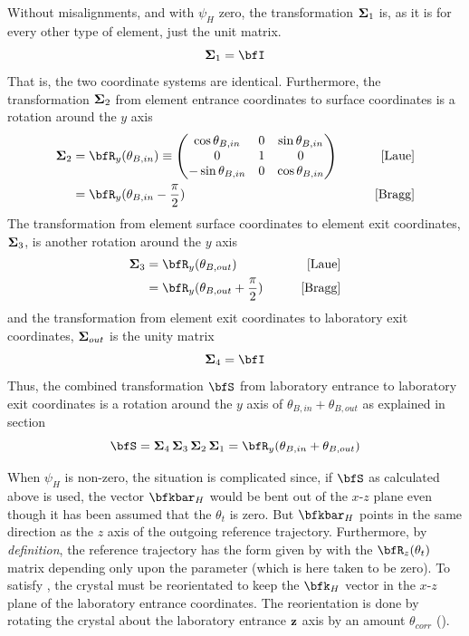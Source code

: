 Without misalignments, and with $\psi_H$ zero, the transformation
${\bf \Sigma}_1$ is, as it is for every other type of element,
just the unit matrix. 
\begin{equation}
  \Bf\Sigma_1 = \bfI
\end{equation}
That is, the two coordinate systems are
identical. Furthermore, the transformation ${\bf \Sigma}_2$ from element
entrance coordinates to surface coordinates is a rotation around the $y$
axis
\begin{align}
  \Bf\Sigma_2 &= \bfR_y(\theta_{B,in}) \equiv \begin{pmatrix}
     \cos\theta_{B,in} & 0 & \sin\theta_{B,in} \\
     0                 & 1 & 0                 \\
    -\sin\theta_{B,in} & 0 & \cos\theta_{B,in} \\
  \end{pmatrix}
  \qquad &\text{[Laue]}
  \label{mt0t010} \\
  &= \bfR_y(\theta_{B,in} - \frac{\pi}{2})
  \qquad &\text{[Bragg]} \nonumber
\end{align}
The transformation from element surface coordinates to element exit
coordinates, ${\bf \Sigma}_3$, is another rotation around the $y$ axis 
\begin{align}
  \Bf\Sigma_3 &= \bfR_y(\theta_{B,out})
  \qquad &\text{[Laue]} \\
  &= \bfR_y(\theta_{B,out} + \frac{\pi}{2})
  \qquad &\text{[Bragg]} \nonumber
\end{align}
and the transformation from element exit coordinates
to laboratory exit coordinates, ${\bf \Sigma}_{out}$ is the unity matrix
\begin{equation}
  \Bf\Sigma_4 = \bfI
\end{equation}
Thus, the combined transformation $\bfS$ from laboratory entrance to
laboratory exit coordinates is a rotation around the $y$ axis of
$\theta_{B,in}+\theta_{B,out}$ as explained in section
\begin{equation}
  \bfS = \Bf\Sigma_4 \, \Bf\Sigma_3 \, \Bf\Sigma_2 \, \Bf\Sigma_1 
  = \bfR_y(\theta_{B,in}+\theta_{B,out})
\end{equation}

When $\psi_H$ is non-zero, the situation is complicated since, if
$\bfS$ as calculated above is used, the vector $\bfkbar_H$ would be
bent out of the $x$-$z$ plane even though it has been assumed that the
 $\theta_t$ is zero. But $\bfkbar_H$ points in the same
direction as the $z$ axis of the outgoing reference
trajectory. Furthermore, by {\em definition}, the reference trajectory
has the form given by  with the $\bfR_{z}(\theta_t)$ matrix
depending only upon the  parameter (which is here taken
to be zero). To satisfy , the crystal must be reorientated to
keep the $\bfk_H$ vector in the $x$-$z$ plane of the laboratory
entrance coordinates.  The reorientation is done by rotating the
crystal about the laboratory entrance ${\bf z}$ axis by an amount
$\theta_{corr}$ ().

